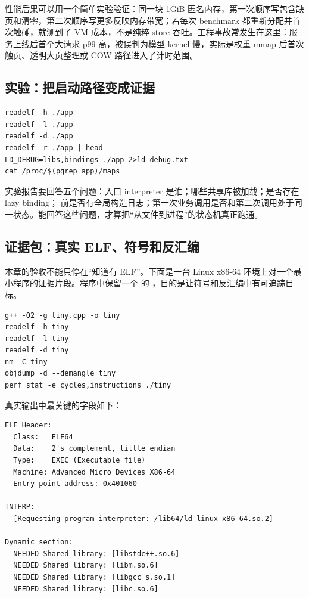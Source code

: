 性能后果可以用一个简单实验验证：同一块 1GiB 匿名内存，第一次顺序写包含缺页和清零，第二次顺序写更多反映内存带宽；若每次 benchmark 都重新分配并首次触碰，就测到了 VM 成本，不是纯粹 store 吞吐。工程事故常发生在这里：服务上线后首个大请求 p99 高，被误判为模型 kernel 慢，实际是权重 mmap 后首次触页、透明大页整理或 COW 路径进入了计时范围。

\subsection{实验：把启动路径变成证据}

\begin{lstlisting}[numbers=none,caption={启动路径实验命令}]
readelf -h ./app
readelf -l ./app
readelf -d ./app
readelf -r ./app | head
LD_DEBUG=libs,bindings ./app 2>ld-debug.txt
cat /proc/$(pgrep app)/maps
\end{lstlisting}

实验报告要回答五个问题：入口 interpreter 是谁；哪些共享库被加载；是否存在 lazy binding； 前是否有全局构造日志；第一次业务调用是否和第二次调用处于同一状态。能回答这些问题，才算把“从文件到进程”的状态机真正跑通。

\subsection{证据包：真实 ELF、符号和反汇编}

本章的验收不能只停在“知道有 ELF”。下面是一台 Linux x86-64 环境上对一个最小程序的证据片段。程序中保留一个  的 ，目的是让符号和反汇编中有可追踪目标。

\begin{lstlisting}[numbers=none,caption={最小证据命令}]
g++ -O2 -g tiny.cpp -o tiny
readelf -h tiny
readelf -l tiny
readelf -d tiny
nm -C tiny
objdump -d --demangle tiny
perf stat -e cycles,instructions ./tiny
\end{lstlisting}

真实输出中最关键的字段如下：

\begin{lstlisting}[numbers=none,caption={ELF 和动态链接证据片段}]
ELF Header:
  Class:   ELF64
  Data:    2's complement, little endian
  Type:    EXEC (Executable file)
  Machine: Advanced Micro Devices X86-64
  Entry point address: 0x401060

INTERP:
  [Requesting program interpreter: /lib64/ld-linux-x86-64.so.2]

Dynamic section:
  NEEDED Shared library: [libstdc++.so.6]
  NEEDED Shared library: [libm.so.6]
  NEEDED Shared library: [libgcc_s.so.1]
  NEEDED Shared library: [libc.so.6]
\end{lstlisting}

